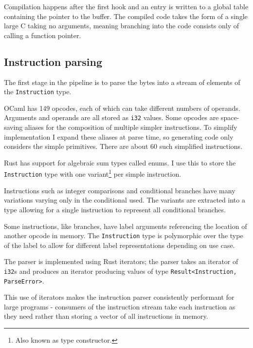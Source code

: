 Compilation happens after the first hook and an entry is written to a global table containing the
pointer to the buffer. The compiled code takes the form of a single large C taking no
arguments, meaning branching into the code consists only of calling a function pointer.

\subsection{Instruction parsing}

The first stage in the pipeline is to parse the bytes into a stream of elements of the
\texttt{Instruction} type.

\label{instruction-type}

OCaml has 149 opcodes, each of which can take different numbers of operands. Arguments and operands
are all stored as \texttt{i32} values. Some opcodes are space-saving aliases for the composition of
multiple simpler instructions. To simplify implementation I expand these aliases at parse time, so
generating code only considers the simple primitives. There are about 60 such simplified
instructions.

Rust has support for algebraic sum types called enums. I use this to store the \texttt{Instruction}
type with one variant\footnote{Also known as type constructor.} per simple instruction.

Instructions such as integer comparisons and conditional branches have many variations varying only
in the conditional used. The variants are extracted into a type allowing for a single instruction
to
represent all conditional branches.

Some instructions, like branches, have label arguments referencing the location of another opcode
in
memory. The \texttt{Instruction} type is polymorphic over the type of the label to allow for
different label representations depending on use case.


The parser is implemented using Rust iterators; the parser takes an iterator of \texttt{i32}s and
produces an iterator producing values of type \texttt{Result<Instruction, ParseError>}.

This use of iterators makes the instruction parser consistently performant for large programs -
consumers of the instruction stream take each instruction as they need rather than storing
a vector of all instructions in memory.

